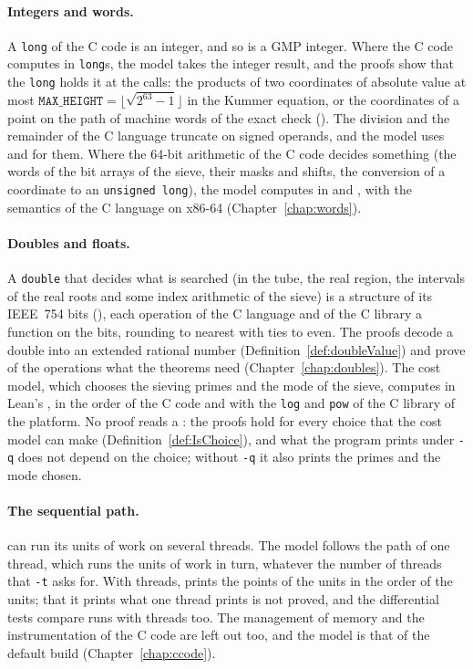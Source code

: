 \paragraph{Integers and words.} A \texttt{long} of the C code is an integer, and so is a GMP
integer. Where the C code computes in \texttt{long}s, the model takes the integer result, and the
proofs show that the \texttt{long} holds it at the calls: the products of two coordinates of
absolute value at most $\mathtt{MAX\_HEIGHT} = \lfloor \sqrt{2^{63} - 1} \rfloor$ in the Kummer
equation, or the coordinates of a point on the path of machine words of the exact check
(). The division and the remainder of
the C language truncate on signed operands, and the model uses  and
 for them. Where the 64-bit arithmetic of the C code decides something (the words
of the bit arrays of the sieve, their masks and shifts, the conversion of a coordinate to an
\texttt{unsigned long}), the model computes in  and , with the semantics
of the C language on x86-64 (Chapter~\ref{chap:words}).

\paragraph{Doubles and floats.} A \texttt{double} that decides what is searched (in the tube, the
real region, the intervals of the real roots and some index arithmetic of the sieve) is a structure
of its IEEE~754 bits (), each operation of the C language and of the C library
a function on the bits, rounding to nearest with ties to even. The proofs decode a double into an
extended rational number (Definition~\ref{def:doubleValue}) and prove of the operations what the
theorems need (Chapter~\ref{chap:doubles}). The cost model, which chooses the sieving primes and the
mode of the sieve, computes in Lean's , in the order of the C code and with the
\texttt{log} and \texttt{pow} of the C library of the platform. No proof reads a : the
proofs hold for every choice that the cost model can make (Definition~\ref{def:IsChoice}), and what
the program prints under \verb|-q| does not depend on the choice; without \verb|-q| it also prints
the primes and the mode chosen.

\paragraph{The sequential path.} \jpoints{} can run its units of work on several threads. The model
follows the path of one thread, which runs the units of work in turn, whatever the number of threads
that \texttt{-t} asks for. With threads, \jpoints{} prints the points of the units in the order of
the units; that it prints what one thread prints is not proved, and the differential tests compare
runs with threads too. The management of memory and the instrumentation of the C code are left out too, and the
model is that of the default build (Chapter~\ref{chap:ccode}).

